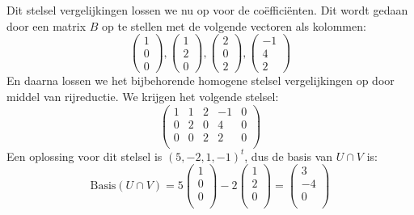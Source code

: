 \documentclass[12pt, a4paper]{article}
\begin{document}
\begin{enumerate}[(a.)]
Dit stelsel vergelijkingen lossen we nu op voor de coëfficiënten. Dit wordt gedaan door een matrix $B$ op te stellen met de volgende vectoren als kolommen:
\begin{equation}
    \begin{pmatrix}
        1\\
        0\\
        0
    \end{pmatrix}
    , 
    \begin{pmatrix}
        1\\
        2\\
        0
    \end{pmatrix}
    ,
    \begin{pmatrix}
        2\\
        0\\
        2
    \end{pmatrix}
    ,
    \begin{pmatrix}
        -1\\
        4\\
        2
    \end{pmatrix}   
\end{equation}
En daarna lossen we het bijbehorende homogene stelsel vergelijkingen op door middel van rijreductie. We krijgen het volgende stelsel:
\begin{equation}
    \left(\begin{array}{cccc|c}
        1 & 1 & 2 & -1 & 0\\
        0 & 2 & 0 & 4 & 0\\
        0 & 0 & 2 & 2 & 0\\
    \end{array}\right)
\end{equation}
Een oplossing voor dit stelsel is $(5,-2,1,-1)^t$, dus de basis van $U \cap V$ is:
\begin{equation}
    \text{Basis}(U \cap V) = 
    5
    \begin{pmatrix}
        1 \\ 
        0 \\ 
        0 \\
    \end{pmatrix}
    - 2
    \begin{pmatrix}
        1 \\
        2 \\
        0 \\
    \end{pmatrix}
    =
    \begin{pmatrix}
        3 \\
        -4 \\
        0 \\
    \end{pmatrix}
\end{equation} 


\end{enumerate}
\end{document}
